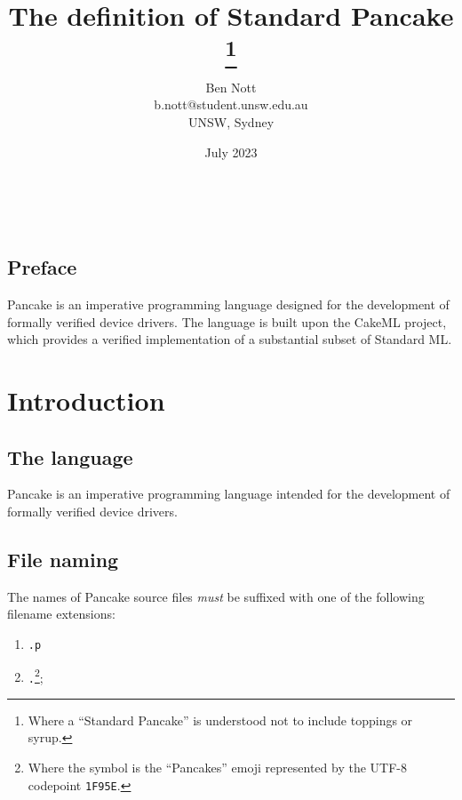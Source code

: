 \documentclass[12pt,a4paper]{report}
\begin{document}
~

\title{The definition of Standard Pancake%
  \footnote{Where a ``Standard Pancake'' is understood not to include toppings or syrup.}}
\date{July 2023}
\author{Ben Nott\\%
  \small{b.nott@student.unsw.edu.au}\\%
  \small{UNSW, Sydney}}

\maketitle


\section*{Preface}
\label{sec:preface}

Pancake is an imperative programming language designed for the development of formally verified device drivers. The language is built upon the CakeML project, which provides a verified implementation of a substantial subset of Standard ML.

\chapter{Introduction}
\label{cha:introduction}

\section{The language}
\label{sec:language}

Pancake is an imperative programming language intended for the development of formally verified device drivers.

\section{File naming}
\label{sec:file-naming}

The names of Pancake source files \emph{must} be suffixed with one of the following filename extensions:
\begin{enumerate}
  \item \verb|.p|
  \item \verb|.|{\Huge{}}\footnote{Where the symbol is the ``Pancakes'' emoji represented by the UTF-8 codepoint \texttt{1F95E}.};
\end{enumerate}
\end{document}

